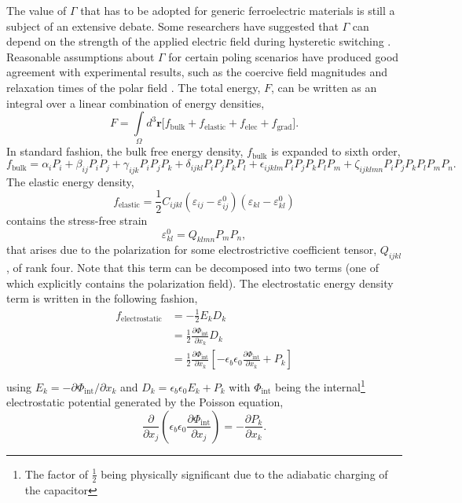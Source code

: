 \documentclass[22pt]{article} %
\begin{document}
%
The value of $\Gamma$ that has to be adopted for generic ferroelectric materials is still a subject of an extensive debate. Some researchers have suggested that $\Gamma$ can depend on the strength of the applied electric field during hysteretic switching \cite{Meng2015}.
%
Reasonable assumptions about $\Gamma$ for certain poling scenarios have produced good agreement with experimental results, such as the coercive field magnitudes and relaxation times of the polar field \cite{Fridkin2000, Hlinka2007}.
%
The total energy, $F$, can be written as an integral over a linear combination of energy densities,
%
$$F = \int\limits_\Omega d^3 \textbf{r} \Bigg[f_\mathrm{bulk} + f_\mathrm{elastic} + f_\mathrm{elec} + f_\mathrm{grad} \Bigg].$$
%
In standard fashion, the bulk free energy density, $f_\mathrm{bulk}$ is expanded to sixth order,
%
$$f_\mathrm{bulk} = \alpha_{i} P_i + \beta_{ij} P_i P_j + \gamma_{ijk} P_i P_j P_k + \delta_{ijkl} P_i P_j P_k P_l  + \epsilon_{ijklm} P_i P_j P_k P_l P_m + \zeta_{ijklmn} P_i P_j P_k P_l P_m P_n.$$
%
The elastic energy density, 
%
$$f_\mathrm{elastic} = \frac{1}{2} C_{ijkl} \left(\varepsilon_{ij} - \varepsilon_{ij}^0 \right) \left(\varepsilon_{kl} - \varepsilon_{kl}^0 \right) $$
%
contains the stress-free strain
%
$$\varepsilon_{kl}^0 = Q_{klmn} P_m P_n,$$
%
that arises due to the polarization for some electrostrictive coefficient tensor, $Q_{ijkl}$, of rank four. 
%
Note that this term can be decomposed into two terms (one of which explicitly contains the polarization field).
%
The electrostatic energy density term is written in the following fashion, 
%
\begin{align}\nonumber
f_\mathrm{electrostatic} &= - \frac{1}{2} E_k D_k\\ \nonumber
&= \frac{1}{2} \frac{\partial \Phi_\mathrm{int}}{\partial x_k} D_k\\ \nonumber
&= \frac{1}{2} \frac{\partial \Phi_\mathrm{int}}{\partial x_k} \left[- \epsilon_b \epsilon_0 \frac{\partial \Phi_\mathrm{int}}{\partial x_k}  + P_k\right]\\ \nonumber
\end{align}
%
using $E_k = - \partial \Phi_\mathrm{int} / \partial x_k$ and $D_k = \epsilon_b \epsilon_0 E_k + P_k$ with $\Phi_\mathrm{int}$ being the internal\footnote[4]{The factor of $\frac{1}{2}$ being physically significant due to the adiabatic charging of the capacitor} electrostatic potential generated by the Poisson equation,
%
$$\frac{\partial}{\partial x_j} \left( \epsilon_b \epsilon_0 \frac{\partial \Phi_\mathrm{int}}{\partial x_j}\right) = - \frac{\partial P_k}{\partial x_k}.$$
\end{document}
